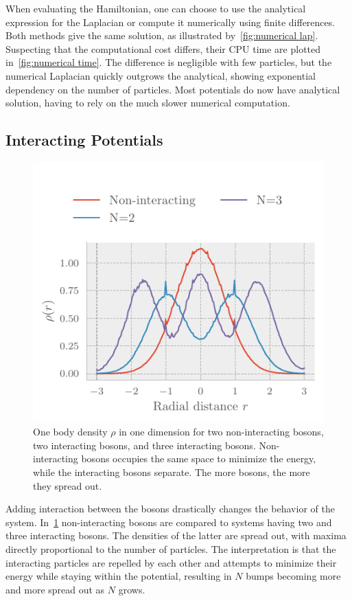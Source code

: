 When evaluating the Hamiltonian, one can choose to use the analytical expression
for the Laplacian or compute it numerically using finite differences. Both
methods give the same solution, as illustrated by~\cref{fig:numerical lap}.
Suspecting that the computational cost differs, their CPU time are plotted
in~\cref{fig:numerical time}. The difference is negligible with few particles,
but the numerical Laplacian quickly outgrows the analytical, showing exponential
dependency on the number of particles. Most potentials do now have analytical
solution, having to rely on the much slower numerical computation. 

\subsection{Interacting Potentials}
\begin{figure}[ht]
	\includegraphics[]{figures/interactingDensity.pdf}
	\centering
	\caption{One body density \(\rho\) in one dimension for two non-interacting
      bosons, two interacting bosons, and three interacting bosons.
      Non-interacting bosons occupies the same space to minimize the energy,
      while the interacting bosons separate. The more bosons, the more they
      spread out.}
	\label{fig:interacting density}
\end{figure}

Adding interaction between the bosons drastically changes the behavior of the
system. In~\cref{fig:interacting density} non-interacting bosons are compared to
systems having two and three interacting bosons. The densities of the latter are
spread out, with maxima directly proportional to the number of particles. The
interpretation is that the interacting particles are repelled by each other and
attempts to minimize their energy while staying within the potential, resulting
in \(N\) bumps becoming more and more spread out as \(N\) grows.


